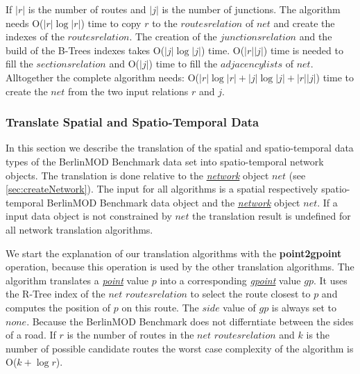 \documentclass[a4paper]{article}
\newcommand{\bmodb} {BerlinMOD Benchmark}
\newcommand{\op}[1]{\textbf{#1}}
\newcommand{\dt}[1]{\textsl{\underline{#1}}}
\begin{document}
{If $|r|$ is the number of routes and $|j|$ is the number of junctions.
The algorithm needs O($|r| \log |r|$) time to copy $r$ to the
$routes relation$ of $net$ and create the indexes of the
$routes relation$. The creation of the $junctions relation$ and the build
of the B-Trees indexes takes O($|j| \log |j|$) time.
O($|r||j|$) time is needed to fill the $sections relation$ and
O($|j|$) time to fill the $adjacency lists$ of $net$. Alltogether
the complete algorithm needs:
O($|r| \log |r|+|j| \log |j| + |r||j|$)
 time to create the $net$ from the two input relations $r$ and $j$.
\subsubsection{Translate Spatial and Spatio-Temporal Data}
\label{sec:translateSTdata}
In this section we describe the translation of the spatial and spatio-temporal
data types of the \bmodb{} data set into spatio-temporal network objects. The
translation is done relative to the \dt{network} object $net$ (see  \ref{sec:createNetwork}).
The input for all algorithms is a spatial respectively
spatio-temporal \bmodb{} data object and the \dt{network} object $net$.
If a input data object is not constrained by $net$ the translation result is
undefined for all network translation algorithms.

We start the explanation of our translation algorithms with the \op{point2gpoint}
operation, because this operation is used by the other translation algorithms.
The algorithm translates a \dt{point} value $p$ into a corresponding
\dt{gpoint} value $gp$. It uses the R-Tree index of the $net$
$routes relation$ to select the route closest to $p$ and computes the
position of $p$ on this route. The $side$ value of $gp$ is always set
to $none$. Because the \bmodb{} does not differntiate between the sides of a
road. If $r$ is the number of routes in the $net$ $routes relation$
and $k$ is the number of possible candidate routes the worst case complexity
of the algorithm is O($k + \log r$).

}
\end{document}
